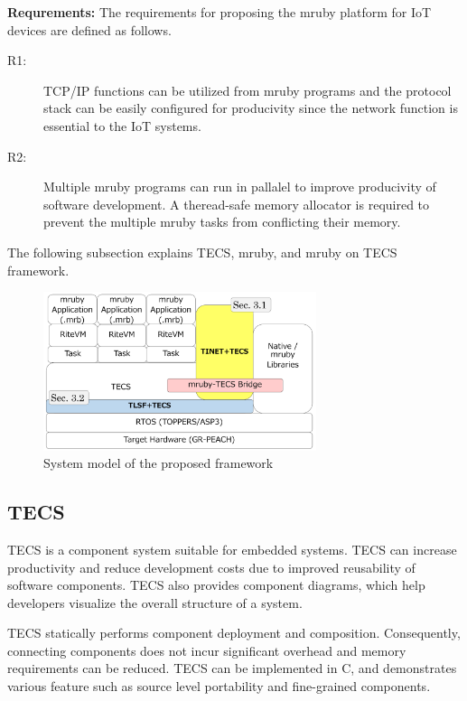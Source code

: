 \documentclass[JIP]{ipsj_v2/UTF8/ipsj}
\begin{document}
{\bf Requrements:} The requirements for proposing the mruby platform for IoT devices are defined as follows.
\begin{description}
    \item[R1:]
        TCP/IP functions can be utilized from mruby programs and the protocol stack can be easily configured for producivity since the network function is essential to the IoT systems.

    \item[R2:]
        Multiple mruby programs can run in pallalel to improve producivity of software development.
        A theread-safe memory allocator is required to prevent the multiple mruby tasks from conflicting their memory.

\end{description}
 
The following subsection explains TECS, mruby, and mruby on TECS framework.


\begin{figure}[t]
    \centering
    \includegraphics[width=8cm,clip]{figure/SystemModel.pdf}
    \caption{System model of the proposed framework}
    \label{fig:SystemModel}
\end{figure}

\subsection{TECS}
\label{sec:TECS}

TECS is a component system suitable for embedded systems.
TECS can increase productivity and reduce development costs due to improved reusability of software components.
TECS also provides component diagrams, which help developers visualize the overall structure of a system.

TECS statically performs component deployment and composition.
Consequently, connecting components does not incur significant overhead and memory requirements can be reduced.
TECS can be implemented in C, and demonstrates various feature such as source level portability and fine-grained components.
\end{document}
